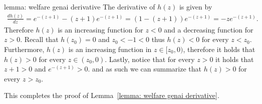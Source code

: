 \begin{proofof}{lemma: welfare genai derivative}
The derivative of $h(z)$ is given by
\begin{align*}
\frac{dh(z)}{dz} = e^{-(z+1)} - (z+1)e^{-(z+1)} = \left( 1 - (z+1) \right)e^{-(z+1)} = -ze^{-(z+1)}.
\end{align*}
Therefore $h(z)$ is an increasing function for $z < 0$ and a decreasing function for $z > 0$. Recall that $h(z_0) = 0$ and $z_0 < -1 < 0$ thus $h(z) < 0$ for every $z < z_0$.
Furthermore, $h(z)$ is an increasing function in $z \in [z_0, 0)$, therefore it holds that $h(z) > 0$ for every $z \in (z_0, 0)$. Lastly, notice that for every $z > 0$ it holds that $z + 1 > 0$ and $e^{-(z+1)} > 0$. and as such we can summarize that $h(z) > 0$ for every $z > z_0$.

This completes the proof of Lemma~\ref{lemma: welfare genai derivative}.
\end{proofof}